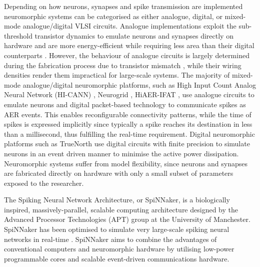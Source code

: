 Depending on how neurons, synapses and spike transmission are implemented neuromorphic systems can be categorised as either analogue, digital, or mixed-mode analogue/digital VLSI circuits. Analogue implementations exploit the sub-threshold transistor dynamics to emulate neurons and synapses directly on hardware \citep{giacom} and are more energy-efficient while requiring less area than their digital counterparts \citep{temamanalogdigital}. However, the behaviour of analogue circuits is largely determined during the fabrication process due to transistor mismatch \citep{giacom,analoguemismatch,bernabeDACsynapses}, while their wiring densities render them impractical for large-scale systems. The majority of mixed-mode analogue/digital neuromorphic platforms, such as High Input Count Analog Neural Network (HI-CANN) \citep{Schemmel_etal10}, Neurogrid \citep{Benjamin_etal14}, HiAER-IFAT \citep{gert}, use analogue circuits to emulate neurons and digital packet-based technology to communicate spikes as AER events. This enables reconfigurable connectivity patterns, while the time of spikes is expressed implicitly since typically a spike reaches its destination in less than a millisecond, thus fulfilling the real-time requirement. Digital neuromorphic platforms such as TrueNorth \citep{Merolla08082014} use digital circuits with finite precision to simulate neurons in an event driven manner to minimise the active power dissipation. Neuromorphic systems suffer from model flexibility, since neurons and synapses are fabricated directly on hardware with only a small subset of parameters exposed to the researcher. 

The Spiking Neural Network Architecture, or SpiNNaker, is a biologically inspired, massively-parallel, scalable computing architecture designed by the Advanced Processor Technologies (APT) group at the University of Manchester. SpiNNaker has been optimised to simulate very large-scale spiking neural networks in real-time \citep{spiNNakerProject}. SpiNNaker aims to combine the advantages of conventional computers and neuromorphic hardware by utilising low-power programmable cores and scalable event-driven communications hardware.

